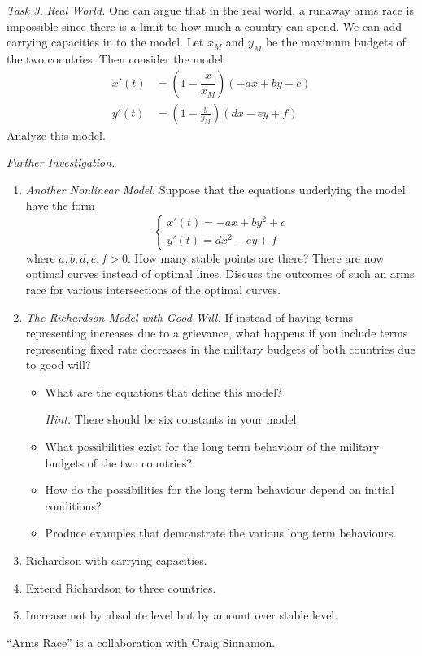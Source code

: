 \emph{Task 3.} \emph{Real World.}
	One can argue that in the real world, a runaway arms race is impossible since there is a limit to how much a country can spend. We can add carrying capacities in to the model. Let $x_M$ and $y_M$ be the maximum budgets of the two countries. Then consider the model
\begin{align*}
x'(t) &= \left(1- \dfrac{x}{x_M}\right) (-ax + by + c)\\
y'(t) &=\left(1-\frac{y}{y_M}\right)(dx-ey+f)
\end{align*}
Analyze this model.

\vfill

\emph{Further Investigation.}
\begin{enumerate}[label=\emph{\arabic*.}]
\item \emph{Another Nonlinear Model.} Suppose that the equations underlying the model have the form
$$
\begin{cases}
x'(t) = -ax+by^2+c\\
y'(t) =dx^2-ey+f	
\end{cases}
$$
where $a,b,d,e,f>0$. How many stable points are there? 
There are now optimal curves instead of optimal lines. 
Discuss the outcomes of such an arms race for various intersections of the optimal curves.

\item \emph{The Richardson Model with Good Will.} If instead of having terms representing increases due to a grievance, what happens if you include terms representing fixed rate decreases in the military budgets of both countries due to good will?
\begin{itemize}
\item What are the equations that define this model? 

\emph{Hint.} There should be six constants in your model.

\item What possibilities exist for the long term behaviour of the military budgets of the two countries?
\item How do the possibilities for the long term behaviour depend on initial conditions?
\item Produce examples that demonstrate the various long term behaviours.
\end{itemize}

\item Richardson with carrying capacities.

\item Extend Richardson to three countries.

\item Increase not by absolute level but by amount over stable level.
\end{enumerate}

\vfill

\hfill ``Arms Race'' is a collaboration with Craig Sinnamon.
\begin{noexercises}
\end{noexercises}
